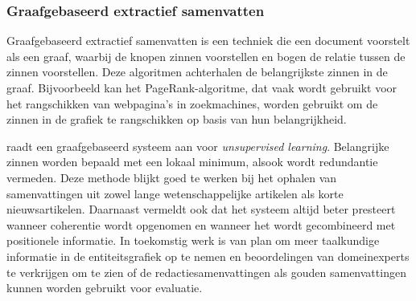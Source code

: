 \subsubsection{Graafgebaseerd extractief samenvatten}

Graafgebaseerd extractief samenvatten is een techniek die een document voorstelt als een graaf, waarbij de knopen zinnen voorstellen en bogen de relatie tussen de zinnen voorstellen. Deze algoritmen achterhalen de belangrijkste zinnen in de graaf. Bijvoorbeeld kan het PageRank-algoritme, dat vaak wordt gebruikt voor het rangschikken van webpagina's in zoekmachines, worden gebruikt om de zinnen in de grafiek te rangschikken op basis van hun belangrijkheid.

\textcite{Parveen2015} raadt een graafgebaseerd systeem aan voor \textit{unsupervised learning}. Belangrijke zinnen worden bepaald met een lokaal minimum, alsook wordt redundantie vermeden. Deze methode blijkt goed te werken bij het ophalen van samenvattingen uit zowel lange wetenschappelijke artikelen als korte nieuwsartikelen. Daarnaast vermeldt \textcite{Parveen2015} ook dat het systeem altijd beter presteert wanneer coherentie wordt opgenomen en wanneer het wordt gecombineerd met positionele informatie. In toekomstig werk is \textcite{Parveen2015} van plan om meer taalkundige informatie in de entiteitsgrafiek op te nemen en beoordelingen van domeinexperts te verkrijgen om te zien of de redactiesamenvattingen als gouden samenvattingen kunnen worden gebruikt voor evaluatie.

